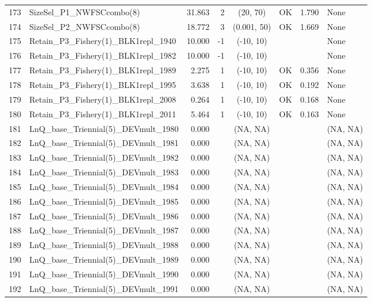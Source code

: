 \documentclass[12pt,]{article}
\begin{document}
\begin{landscape}
\begin{longtable}{rlrrcccl}
  173 & SizeSel\_P1\_NWFSCcombo(8) & 31.863 & 2 & (20, 70) & OK & 1.790 & None \\ 
  174 & SizeSel\_P2\_NWFSCcombo(8) & 18.772 & 3 & (0.001, 50) & OK & 1.669 & None \\ 
  175 & Retain\_P3\_Fishery(1)\_BLK1repl\_1940 & 10.000 & -1 & (-10, 10) &  &  & None \\ 
  176 & Retain\_P3\_Fishery(1)\_BLK1repl\_1982 & 10.000 & -1 & (-10, 10) &  &  & None \\ 
  177 & Retain\_P3\_Fishery(1)\_BLK1repl\_1989 & 2.275 & 1 & (-10, 10) & OK & 0.356 & None \\ 
  178 & Retain\_P3\_Fishery(1)\_BLK1repl\_1995 & 3.638 & 1 & (-10, 10) & OK & 0.192 & None \\ 
  179 & Retain\_P3\_Fishery(1)\_BLK1repl\_2008 & 0.264 & 1 & (-10, 10) & OK & 0.168 & None \\ 
  180 & Retain\_P3\_Fishery(1)\_BLK1repl\_2011 & 5.464 & 1 & (-10, 10) & OK & 0.163 & None \\ 
  181 & LnQ\_base\_Triennial(5)\_DEVmult\_1980 & 0.000 &  & (NA, NA) &  &  &  (NA, NA) \\ 
  182 & LnQ\_base\_Triennial(5)\_DEVmult\_1981 & 0.000 &  & (NA, NA) &  &  &  (NA, NA) \\ 
  183 & LnQ\_base\_Triennial(5)\_DEVmult\_1982 & 0.000 &  & (NA, NA) &  &  &  (NA, NA) \\ 
  184 & LnQ\_base\_Triennial(5)\_DEVmult\_1983 & 0.000 &  & (NA, NA) &  &  &  (NA, NA) \\ 
  185 & LnQ\_base\_Triennial(5)\_DEVmult\_1984 & 0.000 &  & (NA, NA) &  &  &  (NA, NA) \\ 
  186 & LnQ\_base\_Triennial(5)\_DEVmult\_1985 & 0.000 &  & (NA, NA) &  &  &  (NA, NA) \\ 
  187 & LnQ\_base\_Triennial(5)\_DEVmult\_1986 & 0.000 &  & (NA, NA) &  &  &  (NA, NA) \\ 
  188 & LnQ\_base\_Triennial(5)\_DEVmult\_1987 & 0.000 &  & (NA, NA) &  &  &  (NA, NA) \\ 
  189 & LnQ\_base\_Triennial(5)\_DEVmult\_1988 & 0.000 &  & (NA, NA) &  &  &  (NA, NA) \\ 
  190 & LnQ\_base\_Triennial(5)\_DEVmult\_1989 & 0.000 &  & (NA, NA) &  &  &  (NA, NA) \\ 
  191 & LnQ\_base\_Triennial(5)\_DEVmult\_1990 & 0.000 &  & (NA, NA) &  &  &  (NA, NA) \\ 
  192 & LnQ\_base\_Triennial(5)\_DEVmult\_1991 & 0.000 &  & (NA, NA) &  &  &  (NA, NA) \\ 

\end{longtable}
\end{landscape}
\end{document}
